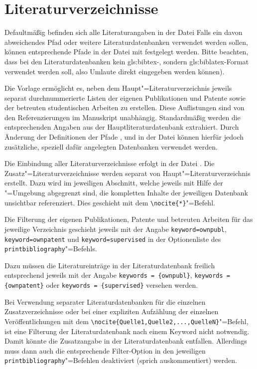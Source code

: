 \section{Literaturverzeichnisse}%
\label{sec:Literaturverzeichnisse}%
%
Defaultmäßig befinden sich alle Literaturangaben in der Datei
Falls ein davon abweichendes Pfad oder weitere Literaturdatenbanken
verwendet werden sollen, können entsprechende Pfade in der Datei
 mit
\lstinline||
festgelegt werden.
Bitte beachten, dass bei den Literaturdatenbanken kein \gls{gls:bibtex}-,
sondern \gls{gls:biblatex}-Format verwendet werden soll,
also Umlaute direkt eingegeben werden können).

Die Vorlage ermöglicht es, neben dem Haupt"=Literaturverzeichnis
jeweils separat durchnummerierte Listen der eigenen Publikationen und Patente
sowie der betreuten studentischen Arbeiten zu erstellen.
Diese Auflistungen sind von den Referenzierungen im Manuskript unabhängig.
Standardmäßig werden die entsprechenden Angaben aus der Hauptliteraturdatenbank
 extrahiert.
Durch Änderung der Definitionen der Pfade
,
 und
in der Datei
können hierfür jedoch zusätzliche, speziell dafür angelegten Datenbanken
verwendet werden.

Die Einbindung aller Literaturverzeichnisse erfolgt in der Datei
.
Die Zusatz"=Literaturverzeichnisse werden separat von Haupt"=Literaturverzeichnis erstellt.
Dazu wird im jeweiligen Abschnitt,
welche jeweils mit Hilfe der "=Umgebung abgegrenzt sind,
die kompletten Inhalte der jeweiligen Datenbank unsichtbar referenziert.
Dies geschieht mit dem \lstinline|\nocite{*}|"=Befehl.

Die Filterung der eigenen Publikationen, Patente und betreuten Arbeiten
für das jeweilige Verzeichnis geschieht jeweils mit der Angabe
\lstinline|keyword=ownpubl|,
\lstinline|keyword=ownpatent|
und
\lstinline|keyword=supervised|
in der Optionenliste des
\lstinline|printbibliography|"=Befehls.

Dazu müssen die Literatureinträge in der Literaturdatenbank freilich
entsprechend jeweils mit der Angabe
\lstinline|keywords = {ownpubl}|,
\lstinline|keywords = {ownpatent}|
oder
\lstinline|keywords = {supervised}|
versehen werden.

Bei Verwendung separater Literaturdatenbanken für die einzelnen Zusatzverzeichnisse
oder bei einer expliziten Aufzählung der einzelnen Veröffentlichungen mit dem
\lstinline|\nocite{Quelle1,Quelle2,...,QuelleN}|"=Befehl,
ist eine Filterung der Literaturdatenbank nach einem Keyword nicht notwendig.
Damit könnte die Zusatzangabe in der Literaturdatenbank entfallen.
Allerdings muss dann auch die entsprechende Filter-Option in den jeweiligen
\lstinline|printbibliography|"=Befehlen deaktiviert (sprich auskommentiert) werden.
